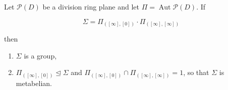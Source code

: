 Let $\mathcal{P}(D)$ be a division ring plane and let $\Pi = \operatorname{Aut}\mathcal{P}(D)$. If

$$\Sigma = \Pi_{([\infty], [0])} \cdot \Pi_{([\infty], [\infty])}$$

then
\begin{enumerate}
\item[(i)] $\Sigma$ is a group,
\item[(ii)] $\Pi_{([\infty], [0])} \trianglelefteq \Sigma$ and $\Pi_{([\infty], [0])} \cap \Pi_{([\infty], [\infty])} = 1$, so that $\Sigma$ is metabelian.
\end{enumerate}
